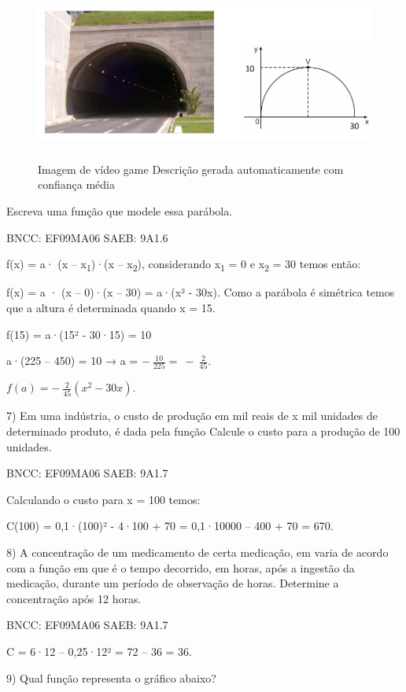 \begin{escolha}
{{{\begin{escolha}
{\begin{figure}
\centering
\includegraphics[width=5.56667in,height=2.24198in]{./_SAEB_9_MAT/media/image143.png}
\caption{Imagem de vídeo game Descrição gerada automaticamente com
confiança média}
\end{figure}

Escreva uma função que modele essa parábola.

BNCC: EF09MA06 SAEB: 9A1.6

f(x) = a· (x -- x\textsubscript{1})·(x -- x\textsubscript{2}),
considerando x\textsubscript{1} = 0 e x\textsubscript{2} = 30 temos
então:

f(x) = a · (x -- 0)·(x -- 30) = a·(x² - 30x). Como a parábola é
simétrica temos que a altura é determinada quando x = 15.

f(15) = a·(15² - 30·15) = 10

a·(225 -- 450) = 10 → a = \(- \ \frac{10}{225} = \  - \ \frac{2}{45}\).

\(f\left( a \right) = - \ \frac{2}{45}(x^{2} - 30x)\).

7) Em uma indústria, o custo de produção em mil reais de x mil unidades
de determinado produto, é dada pela função Calcule o custo para a
produção de 100 unidades.

BNCC: EF09MA06 SAEB: 9A1.7

Calculando o custo para x = 100 temos:

C(100) = 0,1·(100)² - 4·100 + 70 = 0,1·10000 -- 400 + 70 = 670.

8) A concentração de um medicamento de certa medicação, em varia de
acordo com a função em que é o tempo decorrido, em horas, após a
ingestão da medicação, durante um período de observação de horas.
Determine a concentração após 12 horas.

BNCC: EF09MA06 SAEB: 9A1.7

C = 6·12 -- 0,25·12² = 72 -- 36 = 36.

9) Qual função representa o gráfico abaixo?

}
\end{escolha}}}}
\end{escolha}
